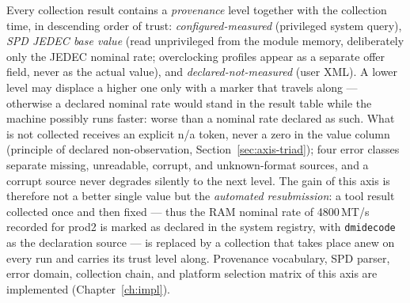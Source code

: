\begin{nurlang}
Every collection result contains a \emph{provenance} level together with the collection time, in
descending order of trust: \emph{configured-measured} (privileged system query),
\emph{SPD JEDEC base value} (read unprivileged from the module memory, deliberately only the
JEDEC nominal rate; overclocking profiles appear as a separate offer field, never as the actual value), and
\emph{declared-not-measured} (user XML). A lower level may displace a higher one only with a
marker that travels along --- otherwise a declared nominal rate would stand in the
result table while the machine possibly runs faster: worse than a nominal rate declared as such.
What is not collected receives an explicit n/a token, never a zero in the value column
(principle of declared non-observation, Section~\ref{sec:axis-triad}); four error classes separate
missing, unreadable, corrupt, and unknown-format sources, and a corrupt source never degrades
silently to the next level. The gain of this axis is therefore not a better single value
but the \emph{automated resubmission}: a tool result collected once and then fixed
--- thus the RAM nominal rate of 4800\,MT/s recorded for prod2 is marked as declared in the system registry,
with \texttt{dmidecode} as the declaration source --- is replaced by a collection
that takes place anew on every run and carries its trust level along. Provenance vocabulary,
SPD parser, error domain, collection chain, and platform selection matrix of this axis are implemented
(Chapter~\ref{ch:impl}).

\end{nurlang}
